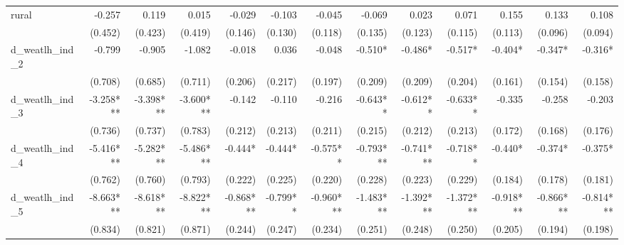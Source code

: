 \begin{tabular}{lrrrrrrrrrrrr}
rural                                       &       -0.257 &        0.119 &        0.015 &       -0.029 &       -0.103 &       -0.045 &       -0.069 &        0.023 &        0.071 &        0.155 &        0.133 &        0.108 \\ 
                                            &      (0.452) &      (0.423) &      (0.419) &      (0.146) &      (0.130) &      (0.118) &      (0.135) &      (0.123) &      (0.115) &      (0.113) &      (0.096) &      (0.094) \\ 
d\_weatlh\_ind\_2                           &       -0.799 &       -0.905 &       -1.082 &       -0.018 &        0.036 &       -0.048 &      -0.510* &      -0.486* &      -0.517* &      -0.404* &      -0.347* &      -0.316* \\ 
                                            &      (0.708) &      (0.685) &      (0.711) &      (0.206) &      (0.217) &      (0.197) &      (0.209) &      (0.209) &      (0.204) &      (0.161) &      (0.154) &      (0.158) \\ 
d\_weatlh\_ind\_3                           &    -3.258*** &    -3.398*** &    -3.600*** &       -0.142 &       -0.110 &       -0.216 &     -0.643** &     -0.612** &     -0.633** &       -0.335 &       -0.258 &       -0.203 \\ 
                                            &      (0.736) &      (0.737) &      (0.783) &      (0.212) &      (0.213) &      (0.211) &      (0.215) &      (0.212) &      (0.213) &      (0.172) &      (0.168) &      (0.176) \\ 
d\_weatlh\_ind\_4                           &    -5.416*** &    -5.282*** &    -5.486*** &      -0.444* &      -0.444* &     -0.575** &    -0.793*** &    -0.741*** &     -0.718** &      -0.440* &      -0.374* &      -0.375* \\ 
                                            &      (0.762) &      (0.760) &      (0.793) &      (0.222) &      (0.225) &      (0.220) &      (0.228) &      (0.223) &      (0.229) &      (0.184) &      (0.178) &      (0.181) \\ 
d\_weatlh\_ind\_5                           &    -8.663*** &    -8.618*** &    -8.822*** &    -0.868*** &     -0.799** &    -0.960*** &    -1.483*** &    -1.392*** &    -1.372*** &    -0.918*** &    -0.866*** &    -0.814*** \\ 
                                            &      (0.834) &      (0.821) &      (0.871) &      (0.244) &      (0.247) &      (0.234) &      (0.251) &      (0.248) &      (0.250) &      (0.205) &      (0.194) &      (0.198) \\ 

\end{tabular}
